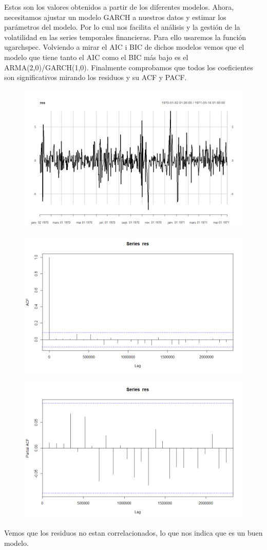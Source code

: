 \documentclass[a4paper,]{article}
\begin{document}
Estos son los valores obtenidos a partir de los diferentes modelos. Ahora, necesitamos ajustar un modelo GARCH a nuestros datos y estimar los parámetros del modelo. Por lo cual nos facilita el análisis y la gestión de la volatilidad en las series temporales financieras. Para ello usaremos la función ugarchspec. Volviendo a mirar el AIC i BIC de dichos modelos vemos que el modelo que tiene tanto el AIC como el BIC más bajo es el ARMA(2,0)/GARCH(1,0). Finalmente comprobamos que todos los coeficientes son significativos mirando los residuos y su ACF y PACF.

\begin{figure}[H]
    \centering \includegraphics[width=0.49\linewidth]{Res.png}
\end{figure}

\begin{figure}[H]
    \centering \includegraphics[width=0.49\linewidth]{glkn.png}
\end{figure}

\begin{figure}[H]
    \centering \includegraphics[width=0.49\linewidth]{ref.png}
\end{figure}

Vemos que los residuos no estan correlacionados, lo que nos indica que es un buen modelo. 
\end{document}
